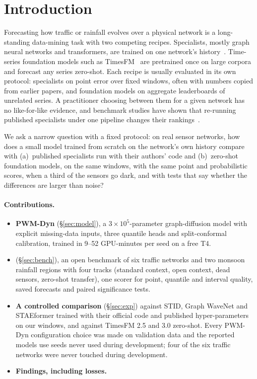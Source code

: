 \section{Introduction}
\sloppy

Forecasting how traffic or rainfall evolves over a physical network is a long-standing data-mining task with two
competing recipes. Specialists, mostly graph neural networks and transformers, are trained on one network's
history~\citep{li2018dcrnn,wu2019graphwavenet,shao2022stid,liu2023staeformer}. Time-series foundation models such
as TimesFM~\citep{das2024timesfm} are pretrained once on large corpora and forecast any series zero-shot. Each
recipe is usually evaluated in its own protocol: specialists on point error over fixed windows, often with numbers
copied from earlier papers, and foundation models on aggregate leaderboards of unrelated series. A practitioner
choosing between them for a given network has no like-for-like evidence, and benchmark studies have shown that
re-running published specialists under one pipeline changes their rankings~\citep{shao2024basicts}.

We ask a narrow question with a fixed protocol: on real sensor networks, how does a small model trained from
scratch on the network's own history compare with (a)~published specialists run with their authors' code and
(b)~zero-shot foundation models, on the same windows, with the same point and probabilistic scores, when a third of
the sensors go dark, and with tests that say whether the differences are larger than noise?

\paragraph{Contributions.}
\begin{itemize}
\item \textbf{PWM-Dyn} (\S\ref{sec:model}), a $3\times10^5$-parameter graph-diffusion model with explicit missing-data
inputs, three quantile heads and split-conformal calibration, trained in 9--52 GPU-minutes per seed on a free T4.
\item \textbf{\benchname{}} (\S\ref{sec:bench}), an open benchmark of six traffic networks and two monsoon rainfall
regions with four tracks (standard context, open context, dead sensors, zero-shot transfer), one scorer for point,
quantile and interval quality, saved forecasts and paired significance tests.
\item \textbf{A controlled comparison} (\S\ref{sec:exp}) against STID, Graph WaveNet and STAEformer trained with
their official code and published hyper-parameters on our windows, and against TimesFM 2.5 and 3.0 zero-shot. Every
PWM-Dyn configuration choice was made on validation data and the reported models use seeds never used during
development; four of the six traffic networks were never touched during development.
\item \textbf{Findings, including losses.} 
\end{itemize}
